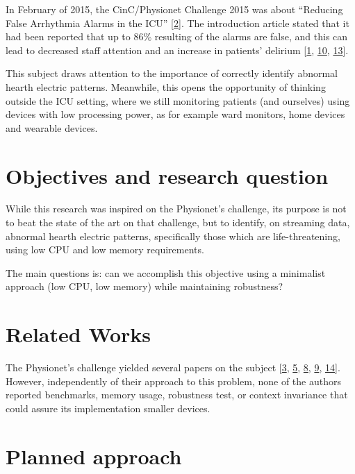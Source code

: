 \documentclass[runningheads]{llncs}
\begin{document}
In February of 2015, the CinC/Physionet Challenge 2015 was about ``Reducing False Arrhythmia Alarms
in the ICU'' {[}\protect\hyperlink{ref-Clifford2015}{2}{]}. The introduction article stated that it had been reported that up to 86\%
resulting of the alarms are false, and this can lead to decreased staff attention and an increase in
patients' delirium {[}\protect\hyperlink{ref-Chambrin2001}{1}, \protect\hyperlink{ref-Lawless1994}{10}, \protect\hyperlink{ref-Parthasarathy2004}{13}{]}.

This subject draws attention to the importance of correctly identify abnormal hearth electric
patterns. Meanwhile, this opens the opportunity of thinking outside the ICU setting, where we still
monitoring patients (and ourselves) using devices with low processing power, as for example ward
monitors, home devices and wearable devices.

\hypertarget{objectives-and-research-question}{%
\section{Objectives and research question}\label{objectives-and-research-question}}

While this research was inspired on the Physionet's challenge, its purpose is not to beat the state
of the art on that challenge, but to identify, on streaming data, abnormal hearth electric patterns,
specifically those which are life-threatening, using low CPU and low memory requirements.

The main questions is: can we accomplish this objective using a minimalist approach (low CPU, low
memory) while maintaining robustness?

\hypertarget{related-works}{%
\section{Related Works}\label{related-works}}

The Physionet's challenge yielded several papers on the subject
{[}\protect\hyperlink{ref-couto2015}{3}, \protect\hyperlink{ref-fallet2015}{5}, \protect\hyperlink{ref-hoogantink2015}{8}, \protect\hyperlink{ref-kalidas2015}{9}, \protect\hyperlink{ref-plesinger2015}{14}{]}. However, independently of
their approach to this problem, none of the authors reported benchmarks, memory usage, robustness
test, or context invariance that could assure its implementation smaller devices.

\hypertarget{planned-approach}{%
\section{Planned approach}\label{planned-approach}}
\end{document}

